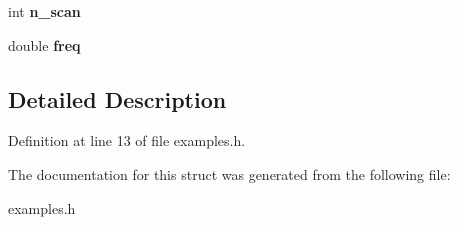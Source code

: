 \begin{DoxyCompactItemize}
\item 
\hypertarget{structparsed__options_aaef8ca52549410b4a3df0cb4d6053734}{
int {\bfseries n\_\-scan}}
\label{structparsed__options_aaef8ca52549410b4a3df0cb4d6053734}

\item 
\hypertarget{structparsed__options_aa8275ab68acb51bec8f5309eb2f2b5de}{
double {\bfseries freq}}
\label{structparsed__options_aa8275ab68acb51bec8f5309eb2f2b5de}

\end{DoxyCompactItemize}


\subsection{Detailed Description}


Definition at line 13 of file examples.h.

The documentation for this struct was generated from the following file:\begin{DoxyCompactItemize}
\item 
examples.h\end{DoxyCompactItemize}
